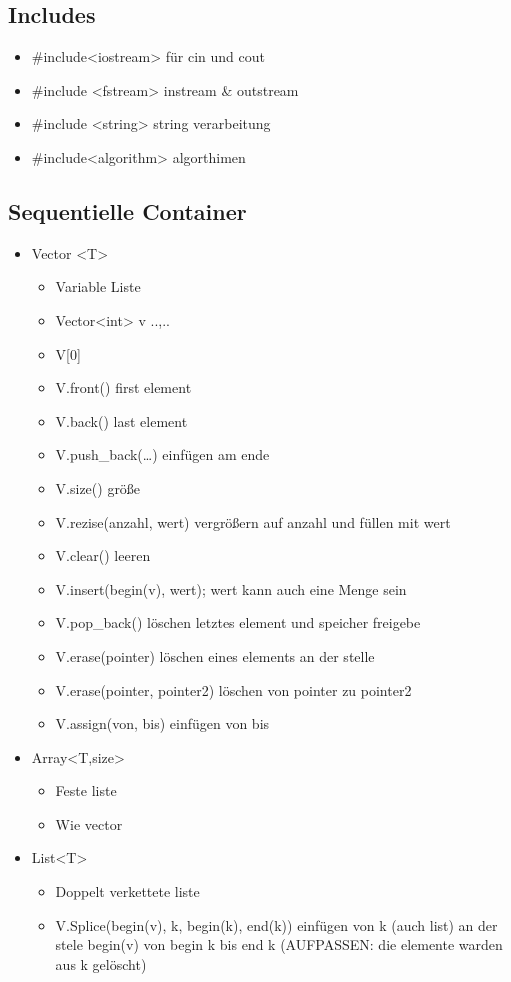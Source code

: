 \subsection{Includes}
\begin{itemize}
	\item \#include<iostream> 	für cin und cout
	\item \#include <fstream>	instream \& outstream
	\item \#include <string>	string verarbeitung
	\item \#include<algorithm>	algorthimen
\end{itemize}
\subsection{Sequentielle Container}
\begin{itemize}
	\item Vector <T>
	\begin{itemize}
		\item Variable Liste
		\item Vector<int> v {..,..}
		\item V[0]
		\item V.front()	first element
		\item V.back()	last element
		\item V.push\_back(…)	einfügen am ende
		\item V.size()		größe
		\item V.rezise(anzahl, wert) 		vergrößern auf anzahl und füllen mit wert
		\item V.clear()	leeren
		\item V.insert(begin(v), wert);	wert kann auch eine Menge sein
		\item V.pop\_back()		löschen letztes element und speicher freigebe
		\item V.erase(pointer)	löschen eines elements an der stelle
		\item V.erase(pointer, pointer2)	löschen von pointer zu pointer2
		\item V.assign(von, bis)	einfügen von bis		
	\end{itemize}
	\item Array<T,size>
	\begin{itemize}
		\item Feste liste
		\item Wie vector
	\end{itemize}
	\item List<T>
	\begin{itemize}
		\item Doppelt verkettete liste
		\item V.Splice(begin(v), k, begin(k), end(k)) 	einfügen von k (auch list) an der stele begin(v) von begin k bis end k (AUFPASSEN: die elemente warden aus k gelöscht)
	\end{itemize}
\end{itemize}
